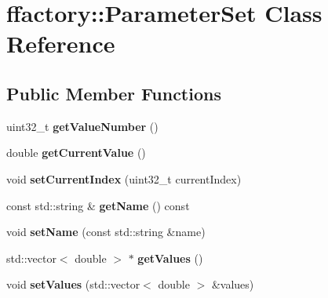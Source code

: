 \hypertarget{classffactory_1_1_parameter_set}{\section{ffactory\-:\-:Parameter\-Set Class Reference}
\label{classffactory_1_1_parameter_set}
}
\subsection*{Public Member Functions}
\begin{DoxyCompactItemize}
\item 
\hypertarget{classffactory_1_1_parameter_set_a189575862c8e4bdc222d64d9dc5ce241}{uint32\-\_\-t {\bfseries get\-Value\-Number} ()}\label{classffactory_1_1_parameter_set_a189575862c8e4bdc222d64d9dc5ce241}

\item 
\hypertarget{classffactory_1_1_parameter_set_a833575fbee435803d92e3eacf72fb06b}{double {\bfseries get\-Current\-Value} ()}\label{classffactory_1_1_parameter_set_a833575fbee435803d92e3eacf72fb06b}

\item 
\hypertarget{classffactory_1_1_parameter_set_a6f3a2b7a04890c2e803b7d7162af0e2e}{void {\bfseries set\-Current\-Index} (uint32\-\_\-t current\-Index)}\label{classffactory_1_1_parameter_set_a6f3a2b7a04890c2e803b7d7162af0e2e}

\item 
\hypertarget{classffactory_1_1_parameter_set_a1b7addd8235b6b3ee2536e8803972f49}{const std\-::string \& {\bfseries get\-Name} () const }\label{classffactory_1_1_parameter_set_a1b7addd8235b6b3ee2536e8803972f49}

\item 
\hypertarget{classffactory_1_1_parameter_set_a0ae54904ef6a4fedb3556bb511c600d1}{void {\bfseries set\-Name} (const std\-::string \&name)}\label{classffactory_1_1_parameter_set_a0ae54904ef6a4fedb3556bb511c600d1}

\item 
\hypertarget{classffactory_1_1_parameter_set_abf99a69dd39a0d5a40529be5f5920ffe}{std\-::vector$<$ double $>$ $\ast$ {\bfseries get\-Values} ()}\label{classffactory_1_1_parameter_set_abf99a69dd39a0d5a40529be5f5920ffe}

\item 
\hypertarget{classffactory_1_1_parameter_set_a8e13fb085b13835ef37a03570d337925}{void {\bfseries set\-Values} (std\-::vector$<$ double $>$ \&values)}\label{classffactory_1_1_parameter_set_a8e13fb085b13835ef37a03570d337925}


\end{DoxyCompactItemize}
